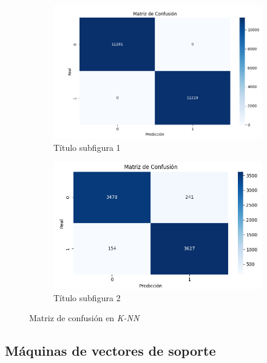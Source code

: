 \begin{figure}[H]
	\begin{subfigure}{.5\textwidth}
		\centering
		\includegraphics[width=1\linewidth]{Imagenes/knn_bin_mat_train}
		\caption{Título subfigura 1}
		\label{fig:sub-first}
	\end{subfigure}
	\begin{subfigure}{.5\textwidth}
		\centering
		\includegraphics[width=1\linewidth]{Imagenes/knn_bin_mat_test}
		\caption{Título subfigura 2}
		\label{fig:sub-second}
	\end{subfigure}
	\caption[Matriz de confusión en \textit{K-NN}]{Matriz de confusión en \textit{K-NN}}
	\label{figT:knn_mat}
\end{figure}

\subsection{Máquinas de vectores de soporte}
\label{subsec:svm_bin}

